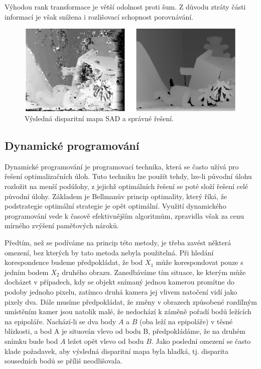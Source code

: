 Výhodou rank transformace je větší odolnost proti šum. Z důvodu ztráty části informací je však snížena i rozlišovací schopnost porovnávání. 

\begin{figure}[bh]
    \centering
    \includegraphics[width=5in]{11_stereo/images/stereo_demo_window}
    \caption{Výsledná disparitní mapa SAD a správné řešení.}
    \label{img:stereo_demo_window}
\end{figure}



\subsection*{Dynamické programování}
Dynamické programování je programovací technika, která se často užívá pro řešení optimalizačních úloh. Tuto techniku lze použít tehdy, lze-li původní úlohu rozložit na menší podúlohy, z jejichž optimálních řešení se poté složí řešení celé původní úlohy. Základem je Bellmanův princip optimality, který říká, že podstrategie optimální strategie je opět optimální. Využití dynamického programování vede k časově efektivnějším algoritmům, zpravidla však za cenu mírného zvýšení paměťových nároků. 

Předtím, než se podíváme na princip této metody, je třeba zavést některá omezení, bez kterých by tato metoda nebyla použitelná. Při hledání korespondence budeme předpokládat, že bod $X_{1}$ může korespondovat pouze s jedním bodem $X_{2}$ druhého obrazu. Zanedbáváme tím situace, ke kterým může docházet v případech, kdy se objekt snímaný jednou kamerou promítne do podoby jednoho pixelu, zatímco druhá kamera jej vlivem natočení vidí jako pixely dva. Dále musíme předpokládat, že změny v obrazech způsobené rozdílným umístěním kamer jsou natolik malé, že nedochází k záměně pořadí bodů ležících na epipoláře. Nachází-li se dva body $A$ a $B$ (oba leží na epipoláře) v těsné blízkosti, a bod A je situován vlevo od bodu B, předpokládáme, že na druhém snímku bude bod $A$ ležet opět vlevo od bodu $B$. Jako poslední omezení se často klade požadavek, aby výsledná disparitní mapa byla hladká, tj. disparita sousedních bodů se příliš neodlišovala.

